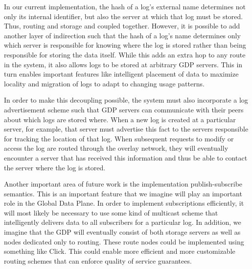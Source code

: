 In our current implementation, the hash of a log's external name determines not only its internal identifier, but also the server at which that log must be stored. Thus, routing and storage and coupled together. However, it is possible to add another layer of indirection such that the hash of a log's name determines only which server is responsible for knowing where the log is stored rather than being responsible for storing the data itself. While this adds an extra hop to any route in the system, it also allows logs to be stored at arbitrary GDP servers. This in turn enables important features like intelligent placement of data to maximize locality and migration of logs to adapt to changing usage patterns.

In order to make this decoupling possible, the system must also incorporate a log advertisement scheme such that GDP servers can communicate with their peers about which logs are stored where. When a new log is created at a particular server, for example, that server must advertise this fact to the servers responsible for tracking the location of that log. When subsequent requests to modify or access the log are routed through the overlay network, they will eventually encounter a server that has received this information and thus be able to contact the server where the log is stored.

Another important area of future work is the implementation publish-subscribe semantics. This is an important feature that we imagine will play an important role in the Global Data Plane. In order to implement subscriptions efficiently, it will most likely be necessary to use some kind of multicast scheme that intelligently delivers data to all subscribers for a particular log. In addition, we imagine that the GDP will eventually consist of both storage servers as well as nodes dedicated only to routing. These route nodes could be implemented using something like Click. \cite{click} This could enable more efficient and more customizable routing schemes that can enforce quality of service guarantees.